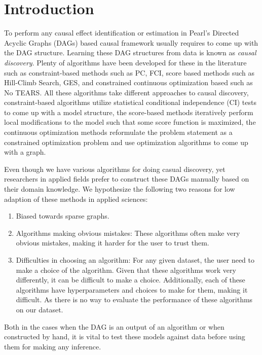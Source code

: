\documentclass{article}
\begin{document}
\section{Introduction}

To perform any causal effect identification or estimation in Pearl's Directed
Acyclic Graphs (DAGs) based causal framework usually requires to come up with
the DAG structure. Learning these DAG structures from data is known as
\emph{causal discovery}. Plenty of algorithms have been developed for these in
the literature such as constraint-based methods such as PC, FCI, score based
methods such as Hill-Climb Search, GES, and constrained continuous optimization
based such as No TEARS. All these algorithms take different approaches to
causal discovery, constraint-based algorithms utilize statistical conditional
independence (CI) tests to come up with a model structure, the score-based
methods iteratively perform local modifications to the model such that some
score function is maximized, the continuous optimization methods reformulate
the problem statement as a constrained optimization problem and use
optimization algorithms to come up with a graph.

Even though we have various algorithms for doing casual discovery, yet
researchers in applied fields prefer to construct these DAGs manually based on
their domain knowledge. We hypothesize the following two reasons for low
adaption of these methods in applied sciences:

\begin{enumerate}
	\item Biased towards sparse graphs.
	\item Algorithms making obvious mistakes: These algorithms often make
		very obvious mistakes, making it harder for the user to trust
		them.
	\item Difficulties in choosing an algorithm: For any given dataset, the
		user need to make a choice of the algorithm. Given that these
		algorithms work very differently, it can be difficult to make a
		choice. Additionally, each of these algorithms have
		hyperparameters and choices to make for them, making it
		difficult. As there is no way to evaluate the performance of
		these algorithms on our dataset.
\end{enumerate}

Both in the cases when the DAG is an output of an algorithm or when constructed
by hand, it is vital to test these models against data before using them for
making any inference. 
\end{document}
